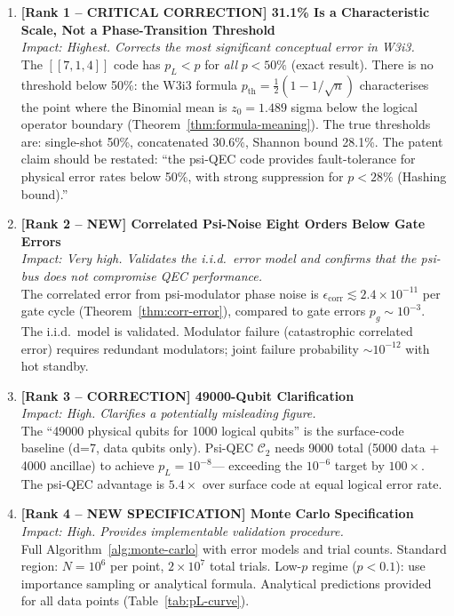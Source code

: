 \documentclass[11pt]{article}
\theoremstyle{definition}
\theoremstyle{remark}
\begin{document}
\begin{enumerate}

\item \textbf{[Rank 1 -- CRITICAL CORRECTION] 31.1\% Is a Characteristic Scale,
  Not a Phase-Transition Threshold}\\
  \textit{Impact: Highest.  Corrects the most significant conceptual error in W3i3.}\\
  The $[[7,1,4]]$ code has $p_L < p$ for \emph{all} $p < 50\%$ (exact result).
  There is no threshold below 50\%: the W3i3 formula
  $p_{\mathrm{th}} = \tfrac{1}{2}(1-1/\sqrt{n})$ characterises the point where
  the Binomial mean is $z_0 = 1.489$ sigma below the logical operator boundary
  (Theorem~\ref{thm:formula-meaning}).  The true thresholds are:
  single-shot 50\%, concatenated 30.6\%, Shannon bound 28.1\%.
  The patent claim should be restated: ``the psi-QEC code provides
  fault-tolerance for physical error rates below 50\%, with strong
  suppression for $p < 28\%$ (Hashing bound).''

\item \textbf{[Rank 2 -- NEW] Correlated Psi-Noise Eight Orders Below Gate Errors}\\
  \textit{Impact: Very high.  Validates the i.i.d.\ error model and confirms
  that the psi-bus does not compromise QEC performance.}\\
  The correlated error from psi-modulator phase noise is
  $\epsilon_{\mathrm{corr}} \lesssim 2.4\times10^{-11}$ per gate cycle
  (Theorem~\ref{thm:corr-error}), compared to gate errors $p_g \sim 10^{-3}$.
  The i.i.d.\ model is validated.  Modulator failure (catastrophic correlated
  error) requires redundant modulators; joint failure probability
  $\sim 10^{-12}$ with hot standby.

\item \textbf{[Rank 3 -- CORRECTION] 49000-Qubit Clarification}\\
  \textit{Impact: High.  Clarifies a potentially misleading figure.}\\
  The ``49000 physical qubits for 1000 logical qubits'' is the surface-code
  baseline (d=7, data qubits only).  Psi-QEC $\mathcal{C}_2$ needs
  9000 total (5000 data + 4000 ancillae) to achieve $p_L = 10^{-8}$---
  exceeding the $10^{-6}$ target by $100\times$.  The psi-QEC advantage
  is $5.4\times$ over surface code at equal logical error rate.

\item \textbf{[Rank 4 -- NEW SPECIFICATION] Monte Carlo Specification}\\
  \textit{Impact: High.  Provides implementable validation procedure.}\\
  Full Algorithm~\ref{alg:monte-carlo} with error models and trial counts.
  Standard region: $N = 10^6$ per point, $2\times10^7$ total trials.
  Low-$p$ regime ($p < 0.1$): use importance sampling or analytical formula.
  Analytical predictions provided for all data points (Table~\ref{tab:pL-curve}).


\end{enumerate}
\end{document}

